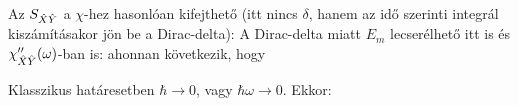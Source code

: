   Az $S_{\hat{X}\hat{Y}}$ a $\chi$-hez hasonlóan kifejthető (itt nincs $\delta$, hanem az idő szerinti integrál kiszámításakor jön be a Dirac-delta):
  A Dirac-delta miatt $E_m$ lecserélhető itt is és $\chi_{\hat{X}\hat{Y}}''(\omega)$-ban is:
  ahonnan következik, hogy 
  
  Klasszikus határesetben $\hbar\to 0$, vagy $\hbar\omega\to 0$. Ekkor:
